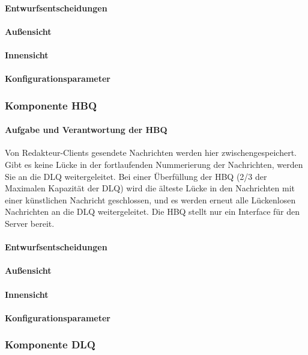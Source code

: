 \documentclass{article}
\begin{document}
			\paragraph{Entwurfsentscheidungen}
			\paragraph{Außensicht}
			\paragraph{Innensicht}
			\paragraph{Konfigurationsparameter}
			
			
		\subsubsection{Komponente HBQ}
			\paragraph{Aufgabe und Verantwortung der HBQ}
				Von Redakteur-Clients gesendete Nachrichten werden hier zwischengespeichert. Gibt es keine Lücke in der fortlaufenden Nummerierung der Nachrichten, werden Sie an die DLQ weitergeleitet. Bei einer Überfüllung der HBQ (2/3 der Maximalen Kapazität der DLQ) wird die älteste Lücke in den Nachrichten mit einer künstlichen Nachricht geschlossen, und es werden erneut alle Lückenlosen Nachrichten an die DLQ weitergeleitet. Die HBQ stellt nur ein Interface für den Server bereit.
			\paragraph{Entwurfsentscheidungen}
			\paragraph{Außensicht}
			\paragraph{Innensicht}
			\paragraph{Konfigurationsparameter}
			
		\subsubsection{Komponente DLQ}
\end{document}

